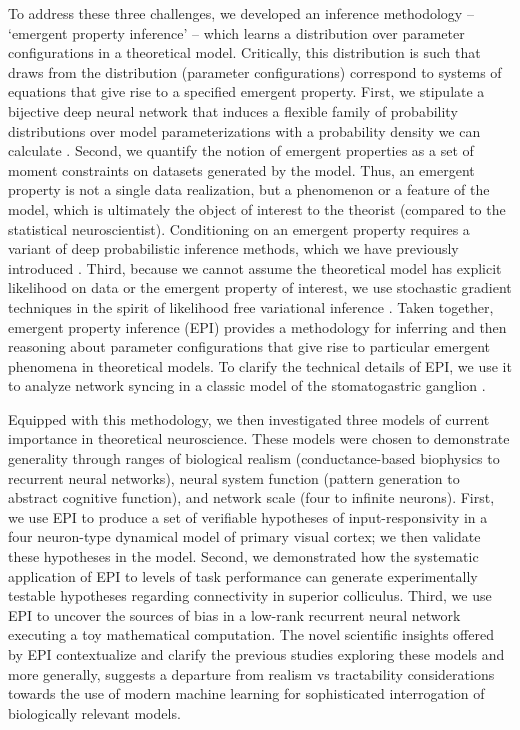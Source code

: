 \documentclass[11pt]{article}
\begin{document}
To address these three challenges, we developed an inference methodology -- `emergent property inference' -- which learns a distribution over parameter configurations in a theoretical model.  Critically, this distribution is such that draws from the distribution (parameter configurations) correspond to systems of equations that give rise to a specified emergent property.  
First, we stipulate a bijective deep neural network that induces a flexible family of probability distributions over model parameterizations with a probability density we can calculate \cite{rezende2015variational, dinh2016density, papamakarios2017masked}.
Second, we quantify the notion of emergent properties as a set of moment constraints on datasets generated by the model.  
Thus, an emergent property is not a single data realization, but a phenomenon or a feature of the model, which is ultimately the object of interest to the theorist (compared to the statistical neuroscientist).  
Conditioning on an emergent property requires a variant of deep probabilistic inference methods, which we have previously introduced \cite{loaiza2017maximum}.
Third,  because we cannot assume the theoretical model has explicit likelihood on data or the emergent property of interest, we use stochastic gradient techniques in the spirit of likelihood free variational inference \cite{tran2017hierarchical}.    
Taken together, emergent property inference (EPI) provides a methodology for inferring and then reasoning about parameter configurations that give rise to particular emergent phenomena in theoretical models. To clarify the technical details of EPI, we use it to analyze network syncing in a classic model of the stomatogastric ganglion \cite{gutierrez2013multiple}.   

Equipped with this methodology, we then investigated three models of current importance in theoretical neuroscience.
These models were chosen to demonstrate generality through ranges of biological realism (conductance-based biophysics to recurrent neural networks), neural system function (pattern generation to abstract cognitive function), and network scale (four to infinite neurons).
First, we use EPI to produce a set of verifiable hypotheses of input-responsivity in a four neuron-type dynamical model of primary visual cortex; we then validate these hypotheses in the model.
Second, we demonstrated how the systematic application of EPI to levels of task performance can generate experimentally testable hypotheses regarding connectivity in superior colliculus.  
Third, we use EPI to uncover the sources of bias in a low-rank recurrent neural network executing a toy mathematical computation.  
The novel scientific insights offered by EPI contextualize and clarify the previous studies exploring these models \cite{gutierrez2013multiple, litwin2016inhibitory, duan2018collicular, mastrogiuseppe2018linking} and more  generally, suggests a departure from realism vs tractability considerations towards the use of modern machine learning for sophisticated interrogation of biologically relevant models.
\end{document}
